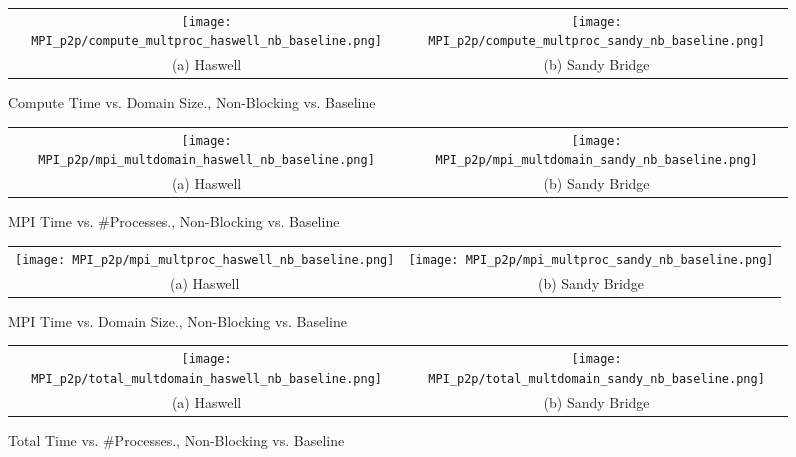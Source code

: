\begin{enumerate}
	\begin{figure}[h] %
		\hspace*{-0.25\linewidth}\begin{tabular}{cc}
			\texttt{[image: MPI\_p2p/compute\_multproc\_haswell\_nb\_baseline.png]} & \texttt{[image: MPI\_p2p/compute\_multproc\_sandy\_nb\_baseline.png]} \\
			(a) Haswell &  (b) Sandy Bridge\\[6pt]
		\end{tabular}
		\caption{Compute Time vs. Domain Size., Non-Blocking vs. Baseline}
		\label{fig:compute_multproc_nb_baseline}
	\end{figure}
	
		\begin{figure}[h] %
		\hspace*{-0.25\linewidth}\begin{tabular}{cc}
			\texttt{[image: MPI\_p2p/mpi\_multdomain\_haswell\_nb\_baseline.png]} & \texttt{[image: MPI\_p2p/mpi\_multdomain\_sandy\_nb\_baseline.png]} \\
			(a) Haswell &  (b) Sandy Bridge\\[6pt]
		\end{tabular}
		\caption{MPI Time vs. \#Processes., Non-Blocking vs. Baseline}
		\label{fig:mpi_multdomain_nb_baseline}
	\end{figure}
	
		\begin{figure}[h] %
		\hspace*{-0.25\linewidth}\begin{tabular}{cc}
			\texttt{[image: MPI\_p2p/mpi\_multproc\_haswell\_nb\_baseline.png]} & \texttt{[image: MPI\_p2p/mpi\_multproc\_sandy\_nb\_baseline.png]} \\
			(a) Haswell &  (b) Sandy Bridge\\[6pt]
		\end{tabular}
		\caption{MPI Time vs. Domain Size., Non-Blocking vs. Baseline}
		\label{fig:mpi_multproc_nb_baseline}
	\end{figure}
	
			\begin{figure}[h] %
		\hspace*{-0.25\linewidth}\begin{tabular}{cc}
			\texttt{[image: MPI\_p2p/total\_multdomain\_haswell\_nb\_baseline.png]} & \texttt{[image: MPI\_p2p/total\_multdomain\_sandy\_nb\_baseline.png]} \\
			(a) Haswell &  (b) Sandy Bridge\\[6pt]
		\end{tabular}
		\caption{Total Time vs. \#Processes., Non-Blocking vs. Baseline}
		\label{fig:total_multdomain_nb_baseline}
	\end{figure}
	

\end{enumerate}
